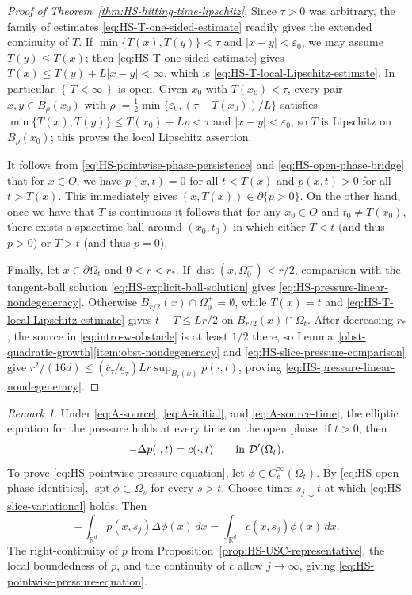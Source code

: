\documentclass[11pt]{amsart}
\numberwithin{equation}{section}
\numberwithin{figure}{section}
\theoremstyle{plain}
\theoremstyle{definition}
\theoremstyle{remark}
\newtheorem{rem}[thm]{Remark}
\theoremstyle{plain}
\newcommand{\set}[1]{\left\{\, #1 \,\right\}}
\newcommand{\abs}[1]{\lvert #1 \rvert}
\newcommand{\vep}{\varepsilon}
\newcommand{\supp}{\operatorname{spt}}
\def\R{\mathbb{R}}
\begin{document}
\begin{proof}[Proof of Theorem~\ref{thm:HS-hitting-time-lipschitz}]
Since \(\tau>0\) was arbitrary, the family of estimates
\eqref{eq:HS-T-one-sided-estimate} readily gives the extended continuity of \(T\).  If \(\min\{T(x),T(y)\}<\tau\) and \(\abs{x-y}<\vep_0\), we may assume
\(T(y)\leq T(x)\); then \eqref{eq:HS-T-one-sided-estimate} gives
\(T(x)\leq T(y)+L\abs{x-y}<\infty\), which is
\eqref{eq:HS-T-local-Lipschitz-estimate}.  In particular \(\set{T<\infty}\) is
open.  Given \(x_0\) with \(T(x_0)<\tau\), every pair
\(x,y\in B_\rho(x_0)\) with
\(\rho:=\tfrac12\min\{\vep_0,(\tau-T(x_0))/L\}\) satisfies
\(\min\{T(x),T(y)\}\leq T(x_0)+L\rho<\tau\) and \(\abs{x-y}<\vep_0\), so
\(T\) is Lipschitz on \(B_\rho(x_0)\); this proves the local Lipschitz
assertion. 





It follows from \eqref{eq:HS-pointwise-phase-persistence} and \eqref{eq:HS-open-phase-bridge} that for $x\in O$, we have $p(x,t) = 0$ for all $t < T(x)$ and $p(x,t) > 0$ for all $t > T(x)$. This immediately gives $(x, T(x))\in \partial \{ p > 0\}$. On the other hand, once we have that $T$ is continuous it follows that for any $x_0\in O$ and $t_0\neq T(x_0)$, there exists a spacetime ball around $(x_0,t_0)$ in which either $T < t$ (and thus $p>0$) or $T > t$ (and thus $p=0$).

Finally, let $x\in\partial\Omega_t$ and $0<r<r_*$.  If
$\operatorname{dist}(x,\Omega_0^{+})<r/2$, comparison with the tangent-ball solution
\eqref{eq:HS-explicit-ball-solution} gives \eqref{eq:HS-pressure-linear-nondegeneracy}.
Otherwise $B_{r/2}(x)\cap\Omega_0^{+}=\emptyset$, while $T(x)=t$ and
\eqref{eq:HS-T-local-Lipschitz-estimate} gives $t-T\leq Lr/2$ on
$B_{r/2}(x)\cap\Omega_t$.  After decreasing $r_*$, the source in
\eqref{eq:intro-w-obstacle} is at least $1/2$ there, so
Lemma~\ref{obst-quadratic-growth}\ref{item:obst-nondegeneracy} and
\eqref{eq:HS-slice-pressure-comparison} give
$r^2/(16d)\leq (\overline c_\tau/\underline c_\tau)Lr
\sup_{B_r(x)}p(\cdot,t)$, proving
\eqref{eq:HS-pressure-linear-nondegeneracy}.
\end{proof}

\begin{rem}\label{rem:HS-pointwise-pressure-equation}
Under \eqref{eq:A-source}, \eqref{eq:A-initial}, and
\eqref{eq:A-source-time}, the
elliptic equation for the pressure holds at every time on the open phase: if
\(t>0\), then
\begin{equation}\label{eq:HS-pointwise-pressure-equation}
    -\Delta p(\cdot,t)=c(\cdot,t)
    \qquad\hbox{in }\mathcal D'(\Omega_t).
\end{equation}
To prove \eqref{eq:HS-pointwise-pressure-equation}, let
\(\phi\in C_c^\infty(\Omega_t)\).  By
\eqref{eq:HS-open-phase-identities}, \(\supp\phi\subset\Omega_s\) for
every \(s>t\). Choose times \(s_j\downarrow t\) at which
\eqref{eq:HS-slice-variational} holds. Then
\[
    -\int_{\R^d}p(x,s_j)\Delta\phi(x)\,dx
    =
    \int_{\R^d}c(x,s_j)\phi(x)\,dx .
\]
The right-continuity of \(p\) from
Proposition~\ref{prop:HS-USC-representative}, the local boundedness of \(p\),
and the continuity of \(c\) allow \(j\to\infty\), giving
\eqref{eq:HS-pointwise-pressure-equation}.
\end{rem}
\end{document}
